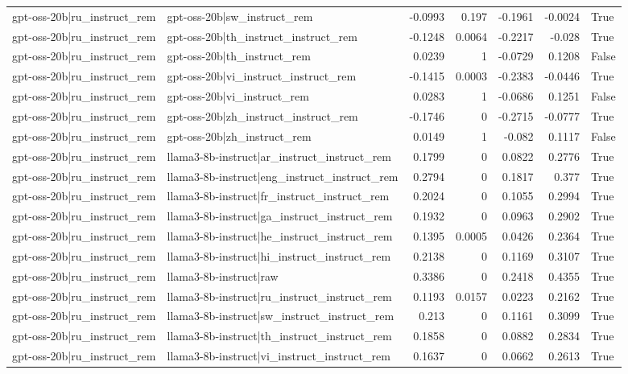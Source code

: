 \begin{table}
\begin{tabular}{l l r r r r l}
gpt-oss-20b|ru_instruct_rem & gpt-oss-20b|sw_instruct_rem & -0.0993 & 0.197 & -0.1961 & -0.0024 & True \\
gpt-oss-20b|ru_instruct_rem & gpt-oss-20b|th_instruct_instruct_rem & -0.1248 & 0.0064 & -0.2217 & -0.028 & True \\
gpt-oss-20b|ru_instruct_rem & gpt-oss-20b|th_instruct_rem & 0.0239 & 1 & -0.0729 & 0.1208 & False \\
gpt-oss-20b|ru_instruct_rem & gpt-oss-20b|vi_instruct_instruct_rem & -0.1415 & 0.0003 & -0.2383 & -0.0446 & True \\
gpt-oss-20b|ru_instruct_rem & gpt-oss-20b|vi_instruct_rem & 0.0283 & 1 & -0.0686 & 0.1251 & False \\
gpt-oss-20b|ru_instruct_rem & gpt-oss-20b|zh_instruct_instruct_rem & -0.1746 & 0 & -0.2715 & -0.0777 & True \\
gpt-oss-20b|ru_instruct_rem & gpt-oss-20b|zh_instruct_rem & 0.0149 & 1 & -0.082 & 0.1117 & False \\
gpt-oss-20b|ru_instruct_rem & llama3-8b-instruct|ar_instruct_instruct_rem & 0.1799 & 0 & 0.0822 & 0.2776 & True \\
gpt-oss-20b|ru_instruct_rem & llama3-8b-instruct|eng_instruct_instruct_rem & 0.2794 & 0 & 0.1817 & 0.377 & True \\
gpt-oss-20b|ru_instruct_rem & llama3-8b-instruct|fr_instruct_instruct_rem & 0.2024 & 0 & 0.1055 & 0.2994 & True \\
gpt-oss-20b|ru_instruct_rem & llama3-8b-instruct|ga_instruct_instruct_rem & 0.1932 & 0 & 0.0963 & 0.2902 & True \\
gpt-oss-20b|ru_instruct_rem & llama3-8b-instruct|he_instruct_instruct_rem & 0.1395 & 0.0005 & 0.0426 & 0.2364 & True \\
gpt-oss-20b|ru_instruct_rem & llama3-8b-instruct|hi_instruct_instruct_rem & 0.2138 & 0 & 0.1169 & 0.3107 & True \\
gpt-oss-20b|ru_instruct_rem & llama3-8b-instruct|raw & 0.3386 & 0 & 0.2418 & 0.4355 & True \\
gpt-oss-20b|ru_instruct_rem & llama3-8b-instruct|ru_instruct_instruct_rem & 0.1193 & 0.0157 & 0.0223 & 0.2162 & True \\
gpt-oss-20b|ru_instruct_rem & llama3-8b-instruct|sw_instruct_instruct_rem & 0.213 & 0 & 0.1161 & 0.3099 & True \\
gpt-oss-20b|ru_instruct_rem & llama3-8b-instruct|th_instruct_instruct_rem & 0.1858 & 0 & 0.0882 & 0.2834 & True \\
gpt-oss-20b|ru_instruct_rem & llama3-8b-instruct|vi_instruct_instruct_rem & 0.1637 & 0 & 0.0662 & 0.2613 & True \\

\end{tabular}
\end{table}

